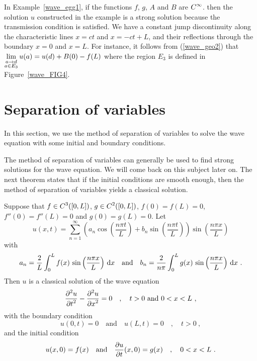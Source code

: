 \begin{egg}
In Example~\ref{wave_egg1}, if the functions $f$, $g$, $A$ and $B$ are
$\displaystyle C^\infty$. then the solution $u$ constructed in the example is a
strong solution because the transmission condition is satisfied.
We have a constant jump discontinuity along the characteristic 
lines $x = ct$ and $x = -ct +L$, and their reflections through the
boundary $x=0$ and $x=L$.  For instance, it follows from
(\ref{wave_geo2}) that 
$\displaystyle \lim_{\substack{a \to d\\ a \in E_3}} u(a) = u(d)+ B(0) - f(L)$
where the region $E_3$ is defined in Figure~\ref{wave_FIG4}.
\end{egg}

\section{Separation of variables}

In this section, we use the method of separation of variables to solve
the wave equation with some initial and boundary conditions.

The method of separation of variables can generally be used to find
strong solutions for the wave equation.  We will come back on this
subject later on.  The next theorem states that if the initial
conditions are smooth enough, then the method of separation of
variables yields a classical solution.

\begin{theorem} \label{wave_spv_conditions}
Suppose that $\displaystyle f \in C^3([0,L])$,
$\displaystyle g\in C^2([0,L])$, $f(0)=f(L)=0$,
$f''(0)=f''(L)=0$ and $g(0)=g(L)=0$.  Let
\begin{equation} \label{wave_class_sol1}
u(x,t) = \sum_{n=1}^\infty \left(a_n\cos\left(\frac{n\pi t}{L}\right)
+ b_n \sin\left(\frac{n\pi t}{L}\right)\right)
\sin\left(\frac{n\pi x}{L}\right)
\end{equation}
with
\[
a_n = \frac{2}{L} \int_0^L f(x) \,\sin\left(\frac{n\pi x}{L}\right)
\,\mathrm{d}{x} \quad \text{and} \quad
b_n = \frac{2}{n\pi} \int_0^L g(x)\, \sin\left(\frac{n\pi x}{L}\right)
\,\mathrm{d}{x} \ .
\]
Then $u$ is a classical solution of the wave equation
\begin{equation} \label{wave_class_sol2}
\frac{\displaystyle \partial^{2}{u}} {\displaystyle \partial t^{2}} - \frac{\displaystyle \partial^{2}{u}} {\displaystyle \partial x^{2}} = 0 \quad , \quad t>0 \text{ and }
0<x<L \ ,
\end{equation}
with the boundary condition
\[
u(0,t) = 0 \quad \text{and} \quad u(L,t) = 0 \quad , \quad t>0 \  ,
\]
and the initial condition
\[
u(x,0) = f(x) \quad \text{and} \quad \frac{\partial{u}}{\partial t}(x,0) = g(x) \quad ,
\quad 0 < x < L \ .
\]
\end{theorem}


